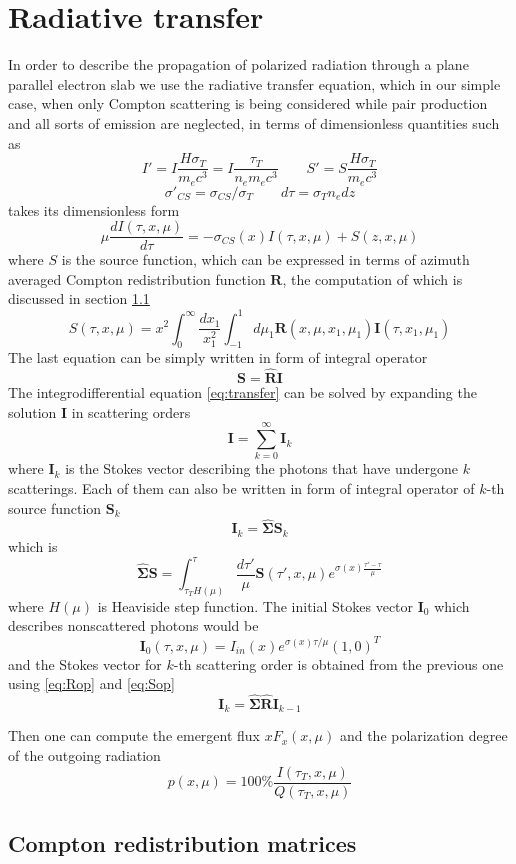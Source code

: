 \documentclass[iop, usenatbib]{emulateapj}
\newcommand{\be}{\begin{equation}}
\newcommand{\ee}{\end{equation}}
\begin{document}
\section{Radiative transfer}
In order to describe the propagation of polarized radiation through a plane parallel electron slab we use the radiative transfer equation, which in our  simple case, when only Compton scattering is being considered while pair production and all sorts of emission are neglected, in terms of dimensionless quantities such as $$
 I'=I \frac{H \sigma_T}{m_e c^3}=I \frac{\tau_T}{n_e m_e c^3} \qquad S'=S \frac{H \sigma_T}{m_e c^3}$$$$
\sigma'_{CS}=\sigma_{CS}/\sigma_T \qquad d\tau= \sigma_T n_e dz $$
takes its dimensionless form 
\be
\label{eq:transfer}
\mu \frac{d I (\tau,x,\mu)}{d\tau} = -  \sigma_{CS}(x)I(\tau,x,\mu) + S(z,x,\mu) 
\ee
where $S$ is the source function, which can be expressed in terms of azimuth averaged Compton redistribution function $\bm{R}$, the 
computation of which is discussed in section \ref{redistr} 
\be
\label{eq:Source}
S(\tau,x,\mu)= x^2 \int_0^\infty \frac{dx_1}{x_1^2} \int_{-1}^1 d\mu_1 
\bm{R}(x,\mu,x_1,\mu_1)\bm{I}(\tau,x_1,\mu_1)
\ee
The last equation can be simply written in form of integral operator
\be
\label{eq:Rop}
\bm{S}=\hat{\bm{R}}\bm{I}
\ee
 The integrodifferential equation \eqref{eq:transfer} can be solved by expanding the solution $\bm{I}$ in scattering orders
 \be
 \bm{I}=\sum_{k=0}^\infty \bm{I}_k
\ee
 where $\bm{I}_k$ is the Stokes vector describing the photons  that have undergone $k$ scatterings. Each of them can also be written in form of integral operator  of $k$-th source function $\bm{S}_k$
\be
\label{eq:Sop}
 \bm{I}_k=\hat{\bm{\Sigma}}\bm{S}_k
\ee
which is
 \be
 \hat{\bm{\Sigma}}\bm{S}=\int_{\tau_TH(\mu)}^\tau \frac{d\tau'}\mu \bm{S}(\tau',x,\mu) e^{\sigma(x)\frac{\tau'-\tau}\mu}
\ee 
where $H(\mu)$ is Heaviside step function. The initial Stokes vector $\bm{I}_0$ which describes nonscattered photons would be
\be
\bm{I}_0(\tau,x,\mu)=I_{in}(x) e^{\sigma(x)\tau/\mu} (1, 0)^T
\ee 
and the Stokes vector for $k$-th scattering order is obtained from the previous one using \eqref{eq:Rop} and \eqref{eq:Sop}
\be
\bm{I}_k=\hat{\bm{\Sigma}}\hat{\bm{R}}\bm{I}_{k-1}
\ee

Then one can compute the emergent flux $xF_x(x,\mu)$
and the polarization degree of the outgoing radiation
\be
p(x,\mu)=100\%\frac{I(\tau_T,x,\mu)}{Q(\tau_T,x,\mu)}
\ee



\subsection{Compton redistribution matrices} \label{redistr}
\end{document}
